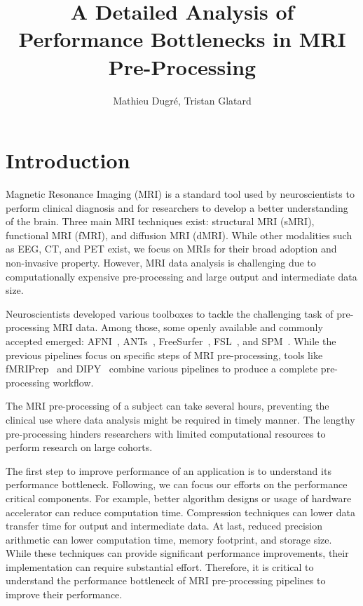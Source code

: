 \documentclass[conference]{IEEEtran}
\title{A Detailed Analysis of Performance Bottlenecks in MRI Pre-Processing}
\author{Mathieu Dugr\'e, Tristan Glatard}
\begin{document}
\maketitle

\begin{abstract}
		
\end{abstract}

\section{Introduction}
Magnetic Resonance Imaging (MRI) is a standard tool used by neuroscientists to perform clinical diagnosis and for researchers to develop a better understanding of the brain. Three main MRI techniques exist: structural MRI (sMRI), functional MRI (fMRI), and diffusion MRI (dMRI). While other modalities such as EEG, CT, and PET exist, we focus on MRIs for their broad adoption and non-invasive property. However, MRI data analysis is challenging due to computationally expensive pre-processing and large output and intermediate data size.

Neuroscientists developed various toolboxes to tackle the challenging task of pre-processing MRI data. Among those, some openly available and commonly accepted emerged: AFNI~\cite{Cox1996-sl}, ANTs~\cite{Avants_undated-fu}, FreeSurfer~\cite{Fischl2012-bp}, FSL~\cite{Jenkinson2012-cq}, and SPM~\cite{Friston2007-ag}. While the previous pipelines focus on specific steps of MRI pre-processing, tools like fMRIPrep~\cite{Esteban2019-og} and DIPY~\cite{Garyfallidis2014-ve} combine various pipelines to produce a complete pre-processing workflow.

The MRI pre-processing of a subject can take several hours, preventing the clinical use where data analysis might be required in timely manner. The lengthy pre-processing hinders researchers with limited computational resources to perform research on large cohorts.

The first step to improve performance of an application is to understand its performance bottleneck. Following, we can focus our efforts on the performance critical components. For example, better algorithm designs or usage of hardware accelerator can reduce computation time. Compression techniques can lower data transfer time for output and intermediate data. At last, reduced precision arithmetic can lower computation time, memory footprint, and storage size. While these techniques can provide significant performance improvements, their implementation can require substantial effort. Therefore, it is critical to understand the performance bottleneck of MRI pre-processing pipelines to improve their performance.
\end{document}
